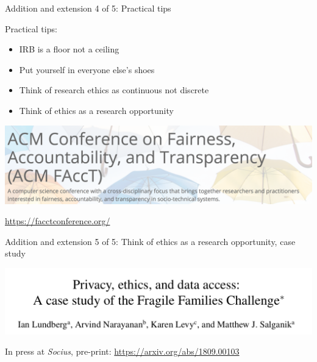 \documentclass{beamer}
\begin{document}
\begin{frame}

\begin{center}
Addition and extension 4 of 5: Practical tips
\end{center}

\end{frame}
\begin{frame}

Practical tips:
\begin{itemize}
\item IRB is a floor not a ceiling
\item Put yourself in everyone else's shoes
\item Think of research ethics as continuous not discrete
\pause
\item Think of ethics as a research opportunity
\end{itemize}

\end{frame}
\begin{frame}

\begin{center}
\includegraphics[width=\textwidth]{figures/facct_star}
\end{center}

\vfill
\url{https://facctconference.org/}
\end{frame}
\begin{frame}

\begin{center}
Addition and extension 5 of 5: Think of ethics as a research opportunity, case study
\end{center}

\end{frame}
\begin{frame}

\begin{center}
\includegraphics[width=\textwidth]{figures/lundberg_privacy_2019_title}
\end{center}

\vfill
In press at \textit{Socius}, pre-print: \url{https://arxiv.org/abs/1809.00103}

\end{frame}
\end{document}
